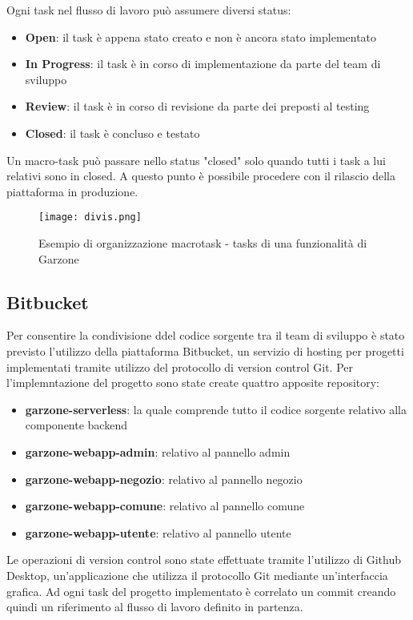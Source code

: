 Ogni task nel flusso di lavoro può assumere diversi status:
\begin{itemize}
    \item \textbf{Open}: il task è appena stato creato e non è ancora stato implementato
    \item \textbf{In Progress}: il task è in corso di implementazione da parte del team di sviluppo
    \item \textbf{Review}: il task è in corso di revisione da parte dei preposti al testing
    \item \textbf{Closed}: il task è concluso e testato
\end{itemize} 
Un macro-task può passare nello status "closed" solo quando tutti i task a lui relativi sono in closed. A questo punto è possibile procedere con il rilascio della piattaforma in produzione.
\begin{figure}[!htb]
    \centering
    \texttt{[image: divis.png]}
    \caption{Esempio di organizzazione macrotask - tasks di una funzionalità di Garzone}
\end{figure}
\subsection{Bitbucket}
Per consentire la condivisione ddel codice sorgente tra il team di sviluppo è stato previsto l'utilizzo della piattaforma Bitbucket, un servizio di hosting per progetti implementati tramite utilizzo del protocollo di version control Git. Per l'implemntazione del progetto sono state create quattro apposite repository:
\begin{itemize}
    \item \textbf{garzone-serverless}: la quale comprende tutto il codice sorgente relativo alla componente backend
    \item \textbf{garzone-webapp-admin}: relativo al pannello admin
    \item \textbf{garzone-webapp-negozio}: relativo al pannello negozio
    \item \textbf{garzone-webapp-comune}: relativo al pannello comune
    \item \textbf{garzone-webapp-utente}: relativo al pannello utente
\end{itemize}   
Le operazioni di version control sono state effettuate tramite l'utilizzo di Github Desktop, un'applicazione che utilizza il protocollo Git mediante un'interfaccia grafica. Ad ogni task del progetto implementato è correlato un commit creando quindi un riferimento al flusso di lavoro definito in partenza. 

